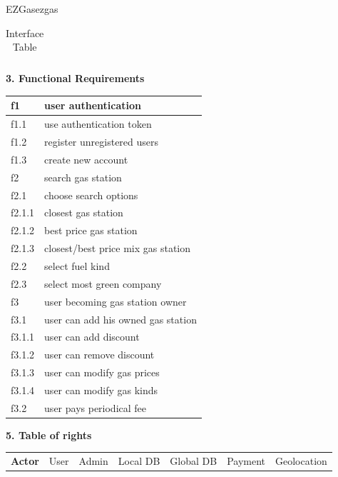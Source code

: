\documentclass[12pt]{article}
\begin{document}
\begin{example}{EZGas}{ezgas}
\begin{table}[H]
\begin{tabular}{|c|c|c|}
      \hline
    \end{tabular}
    \caption{Interface Table}
  \end{table}
  \textbf{3. Functional Requirements}
  \begin{table}[H]
    \centering
    \begin{tabular}{|l|l|}
      \hline
      f1 & user authentication \\
      \hline
      f1.1 & use authentication token \\
      \hline
      f1.2 & register unregistered users \\
      \hline
      f1.3 & create new account \\
      \hline

      f2 & search gas station \\
      \hline
      f2.1 & choose search options \\
      \hline
      f2.1.1 & closest gas station \\
      \hline
      f2.1.2 & best price gas station \\
      \hline
      f2.1.3 & closest/best price mix gas station \\
      \hline
      f2.2 & select fuel kind \\
      \hline
      f2.3 & select most green company \\
      \hline

      f3 & user becoming gas station owner \\
      \hline
      f3.1 & user can add his owned gas station \\
      \hline
      f3.1.1 & user can add discount \\
      \hline
      f3.1.2 & user can remove discount \\
      \hline
      f3.1.3 & user can modify gas prices \\
      \hline
      f3.1.4 & user can modify gas kinds \\
      \hline
      f3.2 & user pays periodical fee \\
      \hline
    \end{tabular}
  \end{table}
  \textbf{5. Table of rights}
  \begin{table}[H]
    \centering
    \begin{tabular}{|c|c|c|c|c|c|c|}
      \textbf{Actor} & User & Admin & Local DB & Global DB & Payment & Geolocation

    \end{tabular}
  \end{table}
\end{example}
\end{document}
